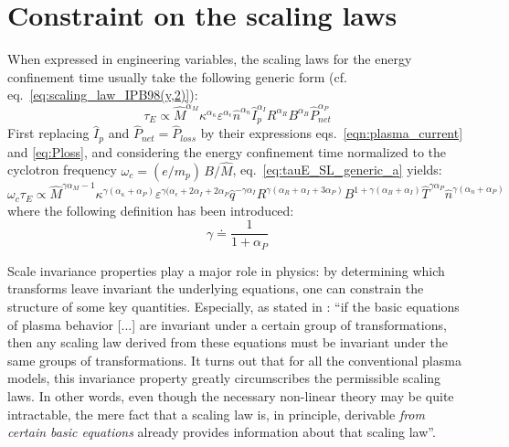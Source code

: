 \section{Constraint on the scaling laws}
\label{appendix:scaling_law_dimensionless}

When expressed in engineering variables, the scaling laws for the energy confinement time usually take the following generic form (cf. eq.~\eqref{eq:scaling_law_IPB98(y,2)}):
\begin{equation}
  \label{eq:tauE_SL_generic_a}
  \tau_E \propto \hat M^{\alpha_M} \kappa^{\alpha_\kappa} \varepsilon^{\alpha_\epsilon} \hat n^{\alpha_n} \hat I_p^{\alpha_I} R^{\alpha_R} B^{\alpha_B} \hat P_{net}^{\alpha_P}
\end{equation}
First replacing $\hat I_p$ and $\hat P_{net} = \hat P_{loss}$ by their expressions eqs.~\eqref{eqn:plasma_current} and \eqref{eq:Ploss}, and considering the energy confinement time normalized to the cyclotron frequency $\omega_c = (e/m_p)\, B/\hat M$, eq.~\eqref{eq:tauE_SL_generic_a} yields:
\begin{equation}
\label{eq:tauE_SL_generic_b}
  \omega_c \tau_E \propto 
  \hat M^{\gamma\alpha_M - 1} 
  \kappa^{\gamma(\alpha_\kappa+\alpha_P)} 
  \varepsilon^{\gamma(\alpha_\epsilon+2\alpha_I+2\alpha_P} 
  \hat q^{-\gamma\alpha_I} 
  R^{\gamma(\alpha_R+\alpha_I+3\alpha_P)} 
  B^{1 + \gamma(\alpha_B+\alpha_I)} 
  \hat T^{\gamma\alpha_P}
  \hat n^{\gamma(\alpha_n+\alpha_P)} 
\end{equation}
where the following definition has been introduced:
$$ 
  \gamma \doteq \frac{1}{1+\alpha_P}
$$

Scale invariance properties play a major role in physics: by determining which transforms leave invariant the underlying equations, one can constrain the structure of some key quantities. Especially, as stated in \cite{Connor1977}: ``if the basic equations of plasma behavior [...] are invariant under a certain group of transformations, then any scaling law derived from these equations must be invariant under the same groups of transformations. It turns out that for all the conventional plasma models, this invariance property greatly circumscribes the permissible scaling laws. In other words, even though the necessary non-linear theory may be quite intractable, the mere fact that a scaling law is, in principle, derivable \emph{from certain basic equations} already provides information about that scaling law''.


